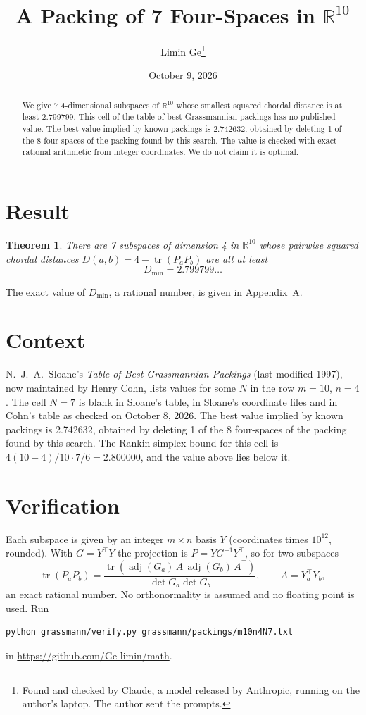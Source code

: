 \documentclass[11pt,a4paper]{article}
\title{A Packing of 7 Four-Spaces in $\mathbb{R}^{10}$}
\author{Limin Ge\thanks{Found and checked by Claude, a model released by Anthropic, running on the author's laptop. The author sent the prompts.}}
\date{October 9, 2026}
\newtheorem*{theorem}{Theorem}
\begin{document}
\maketitle
\begin{abstract}
We give 7 4-dimensional subspaces of $\mathbb{R}^{10}$ whose smallest squared chordal distance is at least 2.799799. This cell of the table of best Grassmannian packings has no published value. The best value implied by known packings is 2.742632, obtained by deleting 1 of the 8 four-spaces of the packing found by this search. The value is checked with exact rational arithmetic from integer coordinates. We do not claim it is optimal.
\end{abstract}

\section{Result}
\begin{theorem}
There are 7 subspaces of dimension 4 in $\mathbb{R}^{10}$ whose pairwise squared chordal distances $D(a,b) = 4 - \operatorname{tr}(P_aP_b)$ are all at least
\[ D_{\min} = 2.799799\ldots \]
\end{theorem}
The exact value of $D_{\min}$, a rational number, is given in Appendix~A.


\section{Context}
N.~J.~A.~Sloane's \emph{Table of Best Grassmannian Packings} (last modified 1997), now maintained by Henry Cohn, lists values for some $N$ in the row $m=10$, $n=4$. The cell $N=7$ is blank in Sloane's table, in Sloane's coordinate files and in Cohn's table as checked on October 8, 2026. The best value implied by known packings is 2.742632, obtained by deleting 1 of the 8 four-spaces of the packing found by this search. The Rankin simplex bound for this cell is $4(10-4)/10\cdot 7/6 = 2.800000$, and the value above lies below it.


\section{Verification}
Each subspace is given by an integer $m\times n$ basis $Y$ (coordinates times $10^{12}$, rounded). With $G=Y^\top Y$ the projection is $P=YG^{-1}Y^\top$, so for two subspaces
\[ \operatorname{tr}(P_aP_b)=\frac{\operatorname{tr}(\operatorname{adj}(G_a)\,A\,\operatorname{adj}(G_b)\,A^\top)}{\det G_a\det G_b},\qquad A=Y_a^\top Y_b, \]
an exact rational number. No orthonormality is assumed and no floating point is used. Run
\begin{verbatim}
python grassmann/verify.py grassmann/packings/m10n4N7.txt
\end{verbatim}
in \url{https://github.com/Ge-limin/math}.
\end{document}
